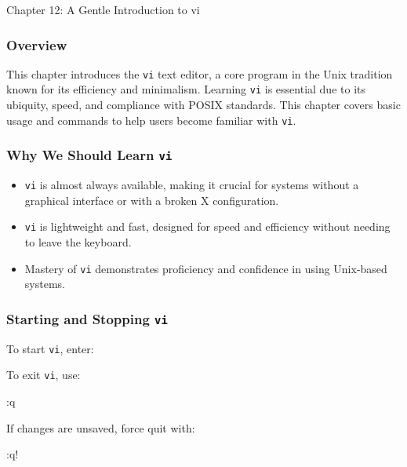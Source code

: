 \begin{notes}{Chapter 12: A Gentle Introduction to vi}
    \subsubsection*{Overview}

    This chapter introduces the \texttt{vi} text editor, a core program in the Unix tradition known for its efficiency and minimalism. Learning \texttt{vi} is essential due to its ubiquity, speed, 
    and compliance with POSIX standards. This chapter covers basic usage and commands to help users become familiar with \texttt{vi}.

    \subsubsection*{Why We Should Learn \texttt{vi}}

    \begin{itemize}
        \item \texttt{vi} is almost always available, making it crucial for systems without a graphical interface or with a broken X configuration.
        \item \texttt{vi} is lightweight and fast, designed for speed and efficiency without needing to leave the keyboard.
        \item Mastery of \texttt{vi} demonstrates proficiency and confidence in using Unix-based systems.
    \end{itemize}

    \subsubsection*{Starting and Stopping \texttt{vi}}

    To start \texttt{vi}, enter:
    \begin{highlight}
    \end{highlight}

    To exit \texttt{vi}, use:
    \begin{highlight}
    \begin{code}[Pseudo]
    :q
    \end{code}
    \end{highlight}

    If changes are unsaved, force quit with:
    \begin{highlight}
    \begin{code}[Pseudo]
    :q!
    \end{code}
    \end{highlight}


\end{notes}
